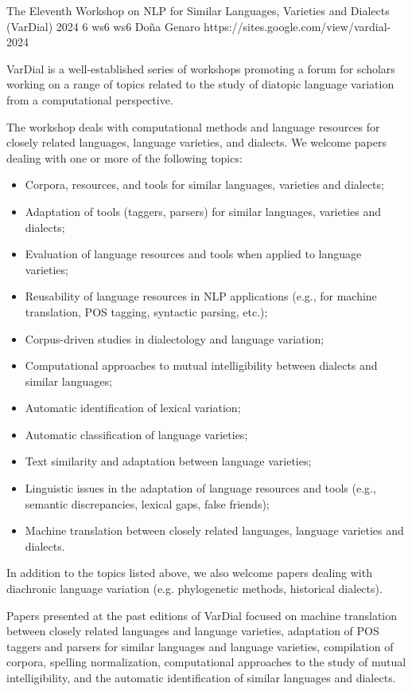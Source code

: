 \begin{wsschedulenolist}
{The Eleventh Workshop on NLP for Similar Languages, Varieties and Dialects (VarDial) 2024}
{6}
{ws6}
{ws6}
{Do\~na Genaro}
{https://sites.google.com/view/vardial-2024}

VarDial is a well-established series of workshops promoting a forum for scholars working on a range of topics related to the study of diatopic language variation from a computational perspective.

The workshop deals with computational methods and language resources for closely related languages, language varieties, and dialects. We welcome papers dealing with one or more of the following topics:

\begin{itemize}
    \item Corpora, resources, and tools for similar languages, varieties and dialects;
    \item Adaptation of tools (taggers, parsers) for similar languages, varieties and dialects;
    \item Evaluation of language resources and tools when applied to language varieties;
    \item Reusability of language resources in NLP applications (e.g., for machine translation, POS tagging, syntactic parsing, etc.);
    \item Corpus-driven studies in dialectology and language variation;
    \item Computational approaches to mutual intelligibility between dialects and similar languages;
    \item Automatic identification of lexical variation;
    \item Automatic classification of language varieties;
    \item Text similarity and adaptation between language varieties;
    \item Linguistic issues in the adaptation of language resources and tools (e.g., semantic discrepancies, lexical gaps, false friends);
    \item Machine translation between closely related languages, language varieties and dialects.
\end{itemize}

In addition to the topics listed above, we also welcome papers dealing with diachronic language variation (e.g. phylogenetic methods, historical dialects).

Papers presented at the past editions of VarDial focused on machine translation between closely related languages and language varieties, adaptation of POS taggers and parsers for similar languages and language varieties, compilation of corpora, spelling normalization, computational approaches to the study of mutual intelligibility, and the automatic identification of similar languages and dialects.



\end{wsschedulenolist}
